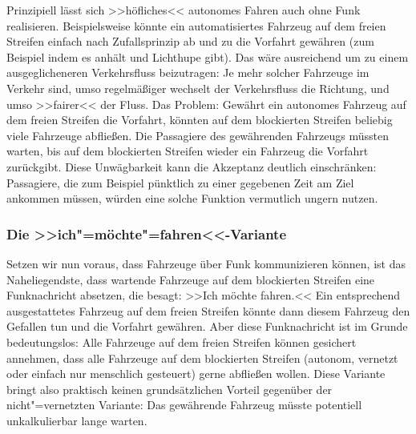 Prinzipiell lässt sich >>höfliches<< autonomes Fahren auch ohne Funk realisieren. Beispielsweise könnte ein automatisiertes Fahrzeug auf dem freien Streifen einfach nach Zufallsprinzip ab und zu die Vorfahrt gewähren (zum Beispiel indem es anhält und Lichthupe gibt). Das wäre ausreichend um zu einem ausgeglicheneren Verkehrsfluss beizutragen: Je mehr solcher Fahrzeuge im Verkehr sind, umso regelmäßiger wechselt der Verkehrsfluss die Richtung, und umso >>fairer<< der Fluss. Das Problem: Gewährt ein autonomes Fahrzeug auf dem freien Streifen die Vorfahrt, könnten auf dem blockierten Streifen beliebig viele Fahrzeuge abfließen. Die Passagiere des gewährenden Fahrzeugs müssten warten, bis auf dem blockierten Streifen wieder ein Fahrzeug die Vorfahrt zurückgibt. Diese Unwägbarkeit kann die Akzeptanz deutlich einschränken: Passagiere, die zum Beispiel pünktlich zu einer gegebenen Zeit am Ziel ankommen müssen, würden eine solche Funktion vermutlich ungern nutzen.

\subsubsection{Die >>ich"=möchte"=fahren<<-Variante}

Setzen wir nun voraus, dass Fahrzeuge über Funk kommunizieren können, ist das Naheliegendste, dass wartende Fahrzeuge auf dem blockierten Streifen eine Funknachricht absetzen, die besagt: >>Ich möchte fahren.<< Ein entsprechend ausgestattetes Fahrzeug auf dem freien Streifen könnte dann diesem Fahrzeug den Gefallen tun und die Vorfahrt gewähren. Aber diese Funknachricht ist im Grunde bedeutungslos: Alle Fahrzeuge auf dem freien Streifen können gesichert annehmen, dass alle Fahrzeuge auf dem blockierten Streifen (autonom, vernetzt oder einfach nur menschlich gesteuert) gerne abfließen wollen. Diese Variante bringt also praktisch keinen grundsätzlichen Vorteil gegenüber der nicht"=vernetzten Variante: %
Das gewährende Fahrzeug müsste potentiell unkalkulierbar lange warten.





